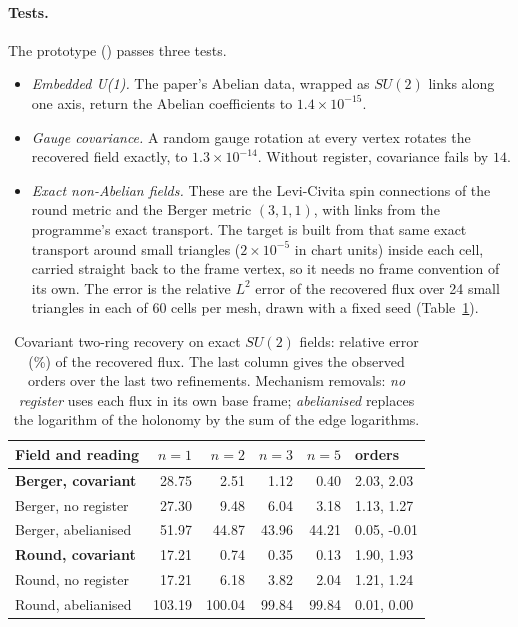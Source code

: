 \documentclass[11pt]{article}
\theoremstyle{definition}
\theoremstyle{remark}
\begin{document}
\paragraph{Tests.} The prototype () passes three
tests.
\begin{itemize}
  \item \emph{Embedded U(1).} The paper's Abelian data, wrapped as $SU(2)$ links along one
    axis, return the Abelian coefficients to $1.4\times10^{-15}$.
  \item \emph{Gauge covariance.} A random gauge rotation at every vertex rotates the
    recovered field exactly, to $1.3\times10^{-14}$. Without register, covariance fails
    by $14$.
  \item \emph{Exact non-Abelian fields.} These are the Levi-Civita spin connections of the
    round metric and the Berger metric $(3,1,1)$, with links from the programme's exact
    transport. The target is built from that same exact transport around small triangles
    ($2\times10^{-5}$ in chart units) inside each cell, carried straight back to the frame
    vertex, so it needs no frame convention of its own. The error is the relative $L^2$
    error of the recovered flux over 24 small triangles in each of
    60 cells per mesh, drawn with a fixed seed (Table~\ref{tab:su2}).
\end{itemize}

\begin{table}[t]\centering\small
\caption{Covariant two-ring recovery on exact $SU(2)$ fields: relative error (\%) of the
recovered flux. The last column gives the observed orders over the last two refinements.
Mechanism removals: \emph{no register} uses each flux in its own base frame;
\emph{abelianised} replaces the logarithm of the holonomy by the sum of the edge
logarithms.}
\label{tab:su2}
\begin{tabular}{lrrrrl}\toprule
Field and reading & $n=1$ & $n=2$ & $n=3$ & $n=5$ & orders \\ \midrule
\textbf{Berger, covariant} & 28.75 & 2.51 & 1.12 & 0.40 & 2.03, 2.03 \\
Berger, no register & 27.30 & 9.48 & 6.04 & 3.18 & 1.13, 1.27 \\
Berger, abelianised & 51.97 & 44.87 & 43.96 & 44.21 & 0.05, -0.01 \\
\midrule
\textbf{Round, covariant} & 17.21 & 0.74 & 0.35 & 0.13 & 1.90, 1.93 \\
Round, no register & 17.21 & 6.18 & 3.82 & 2.04 & 1.21, 1.24 \\
Round, abelianised & 103.19 & 100.04 & 99.84 & 99.84 & 0.01, 0.00 \\
\bottomrule\end{tabular}
\end{table}
\end{document}
